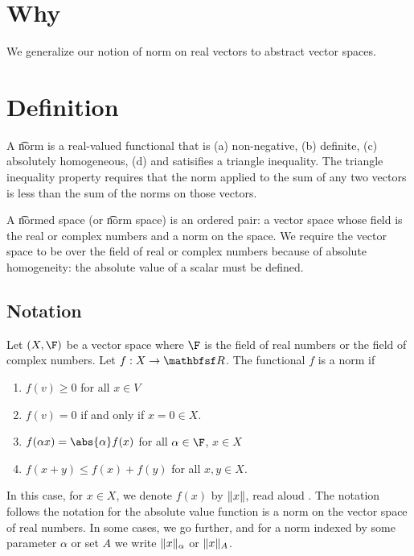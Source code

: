 

\section*{Why}

We generalize our notion of norm on real vectors to abstract vector spaces.

\section*{Definition}

A \t{norm} is a real-valued functional that is
(a) non-negative,
(b) definite,
(c) absolutely homogeneous,
(d) and satisifies a triangle inequality.
The triangle inequality property requires that the norm applied to the sum of any two vectors is less than the sum of the norms on those vectors.

A \t{normed space} (or \t{norm space}) is an ordered pair: a vector space whose field is the real or complex numbers and a norm on the space.
We require the vector space to be over the field of real or complex numbers because of absolute homogeneity: the absolute value of a scalar must be defined.

\subsection*{Notation}

Let $(X, \F )$ be a vector space where $\F $ is the field of real numbers or the field of complex numbers.
Let $f: X \to \R $.
The functional $f$ is a norm if
    \begin{enumerate}
      \item $f(v) \geq 0$ for all $x \in V$
      \item $f(v) = 0$ if and only if $x = 0 \in X$.
      \item $f(\alpha  x) = \abs{\alpha }f(x)$ for all $\alpha \in \F $, $x \in X$
      \item $f(x + y) \leq f(x) + f(y)$ for all $x, y \in X$.
    \end{enumerate}

In this case, for $x \in X$, we denote $f(x)$ by $\lVert x\rVert$, read aloud .
The notation follows the notation for the absolute value function is a norm on the vector space of real numbers.
In some cases, we go further, and for a norm indexed by some parameter $\alpha $ or set $A$ we write $\lVert x\rVert_\alpha $ or $\lVert x\rVert_A$.

